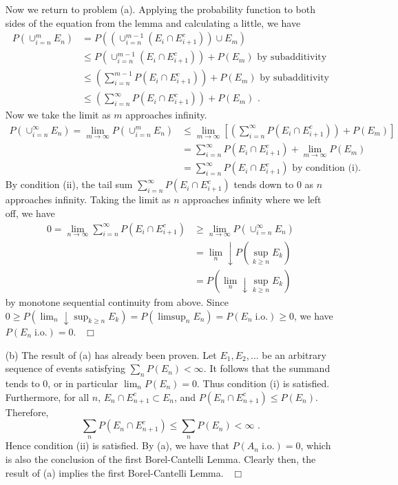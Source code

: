 \documentclass[letterpaper,10pt]{article}
\newcommand{\io}{\;\text{i.o.}}
\begin{document}
\begin{enumerate}
Now we return to problem (a). Applying the probability function to both sides of the equation from the lemma and calculating a little, we have
\begin{align*}
P(\cup_{i=n}^m E_n)
&= P((\cup_{i=n}^{m-1} (E_i \cap E_{i+1}^c)) \cup E_m) \\
&\leq P(\cup_{i=n}^{m-1} (E_i \cap E_{i+1}^c)) + P(E_m) 
\text{ by subadditivity} \\
&\leq \left(\sum_{i=n}^{m-1} P(E_i \cap E_{i+1}^c)\right) + P(E_m) 
\text{ by subadditivity} \\
&\leq \left(\sum_{i=n}^{\infty} P(E_i \cap E_{i+1}^c)\right) + P(E_m)
\text{ .}
\end{align*}
Now we take the limit as $m$ approaches infinity.
\begin{align*}
P(\cup_{i=n}^\infty E_n) 
= \lim_{m \rightarrow \infty} P(\cup_{i=n}^m E_n)
&\leq \lim_{m \rightarrow \infty} [ \left(\sum_{i=n}^{\infty} P(E_i \cap E_{i+1}^c)\right) + P(E_m) ] \\
&= \sum_{i=n}^{\infty} P(E_i \cap E_{i+1}^c) + \lim_{m \rightarrow \infty} P(E_m) \\
&= \sum_{i=n}^{\infty} P(E_i \cap E_{i+1}^c) \text{ by condition (i).}
\end{align*}
By condition (ii), the tail sum $\sum_{i=n}^{\infty} P(E_i \cap E_{i+1}^c)$ tends down to $0$ as $n$ approaches infinity. Taking the limit as $n$ approaches infinity where we left off, we have
\begin{align*}
0 
= \lim_{n \rightarrow \infty} \sum_{i=n}^{\infty} P(E_i \cap E_{i+1}^c)
&\geq \lim_{n \rightarrow \infty} P(\cup_{i=n}^\infty E_n) \\
&= \lim_n\! \downarrow P(\sup_{k \geq n} E_k) \\
&= P( \lim_n\! \downarrow \sup_{k \geq n} E_k)
\end{align*}
by monotone sequential continuity from above. 
Since $0 \geq P(\displaystyle \lim_n\! \downarrow \sup_{k \geq n} E_k) = P( \limsup_n E_n) = P(E_n \io) \geq 0$, we have $P(E_n \io) = 0$.
\mbox{}~\hfill $\Box$

\item[(b)]
The result of (a) has already been proven. Let $E_1, E_2, \dots$ be an arbitrary sequence of events satisfying $\sum_n P(E_n) < \infty$. It follows that the summand tends to $0$, or in particular  $\lim_n P(E_n)=0$. Thus condition (i) is satisfied. Furthermore, for all $n$, $E_n \cap E_{n+1}^c \subset E_n$, and $P(E_n \cap E_{n+1}^c) \leq P(E_n)$. Therefore,
\[
\sum_n P(E_n \cap E_{n+1}^c) \leq \sum_n P(E_n) < \infty \text{ .}
\]
Hence condition (ii) is satisfied. By (a), we have that $P(A_n \io) = 0$, which is also the conclusion of the first Borel-Cantelli Lemma. Clearly then, the result of (a) implies the first Borel-Cantelli Lemma.
\mbox{}~\hfill $\Box$


\end{enumerate}
\end{document}
